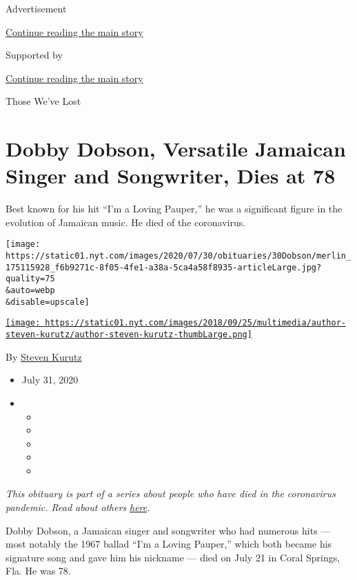 Advertisement

\protect\hyperlink{after-top}{Continue reading the main story}

Supported by

\protect\hyperlink{after-sponsor}{Continue reading the main story}

Those We've Lost

\hypertarget{dobby-dobson-versatile-jamaican-singer-and-songwriter-dies-at-78}{%
\section{Dobby Dobson, Versatile Jamaican Singer and Songwriter, Dies at
78}\label{dobby-dobson-versatile-jamaican-singer-and-songwriter-dies-at-78}}

Best known for his hit ``I'm a Loving Pauper,'' he was a significant
figure in the evolution of Jamaican music. He died of the coronavirus.

\texttt{[image: https://static01.nyt.com/images/2020/07/30/obituaries/30Dobson/merlin\_175115928\_f6b9271c-8f05-4fe1-a38a-5ca4a58f8935-articleLarge.jpg?quality=75\\\&auto=webp\\\&disable=upscale]}

\href{https://www.nytimes.com/by/steven-kurutz}{\texttt{[image: https://static01.nyt.com/images/2018/09/25/multimedia/author-steven-kurutz/author-steven-kurutz-thumbLarge.png]}}

By \href{https://www.nytimes.com/by/steven-kurutz}{Steven Kurutz}

\begin{itemize}
\item
  July 31, 2020
\item
  \begin{itemize}
  \item
  \item
  \item
  \item
  \item
  \end{itemize}
\end{itemize}

\emph{This obituary is part of a series about people who have died in
the coronavirus pandemic. Read about others}
\href{https://www.nytimes.com/interactive/2020/obituaries/people-died-coronavirus-obituaries.html}{\emph{here}}\emph{.}

Dobby Dobson, a Jamaican singer and songwriter who had numerous hits ---
most notably the 1967 ballad ``I'm a Loving Pauper,'' which both became
his signature song and gave him his nickname --- died on July 21 in
Coral Springs, Fla. He was 78.

